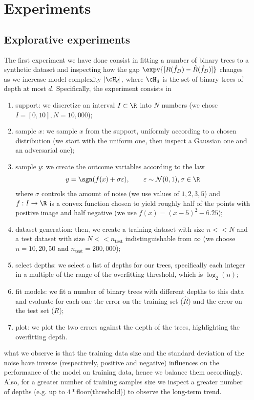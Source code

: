 \section{Experiments}

\subsection{Explorative experiments}
The first experiment we have done consist in fitting a number of binary trees to a synthetic dataset and inspecting how the gap $\expv{[R(\hat f_D) - \hat R(\hat f_D)]}$ changes as we increase model complexity $\vert\cH_d\vert$, where $\cH_d$ is the set of binary trees of depth at most $d$. Specifically, the experiment consists in 
\begin{enumerate}
    \item support: we discretize an interval $I\subset \R$ into $N$ numbers (we chose $I=[0,10], N = 10,000$);
    \item sample $x$: we sample $x$ from the support, uniformly according to a chosen distribution (we start with the uniform one, then inspect a Gaussian one and an adversarial one);
    \item sample $y$: we create the outcome variables according to the law \[y = \sgn(f(x)+\sigma\varepsilon), \qquad \varepsilon\sim\mathcal{N}(0,1), \sigma\in\R\]where $\sigma$ controls the amount of noise (we use values of $1,2,3,5$) and $f:I\to\R$ is a convex function chosen to yield roughly half of the points with positive image and half negative (we use $f(x) = (x-5)^2 -6.25$);
    \item dataset generation: then, we create a training dataset with size $n<<N$ and a test dataset with size $N<<n_\text{test}$ indistinguishable from $\infty$ (we choose $n=10,20,50$ and $n_\text{test}=200,000$);
    \item select depths: we select a list of depths for our trees, specifically each integer in a multiple of the range of the overfitting threshold, which is $\log_2(n)$;
    \item fit models: we fit a number of binary trees with different depths to this data and evaluate for each one the error on the training set ($\hat R$) and the error on the test set ($R$);
    \item plot: we plot the two errors against the depth of the trees, highlighting the overfitting depth. 
\end{enumerate}
what we observe is that the training data size and the standard deviation of the noise have inverse (respectively, positive and negative) influences on the performance of the model on training data, hence we balance them accordingly. Also, for a greater number of training samples size we inspect a greater number of depths (e.g. up to $4*$floor(threshold)) to observe the long-term trend. 
\\

